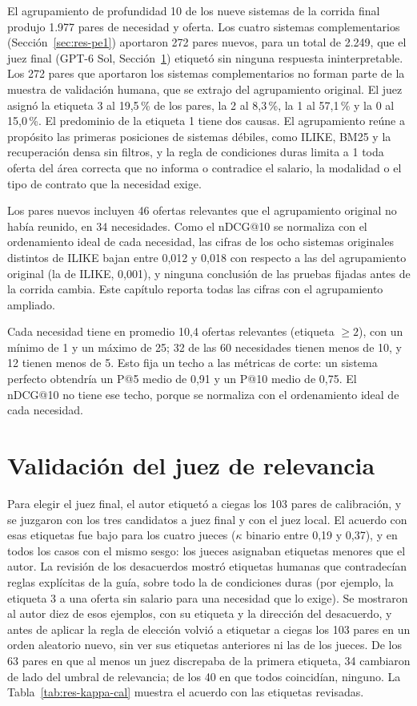 El agrupamiento de profundidad 10 de los nueve sistemas de la corrida final produjo 1.977 pares de necesidad y oferta. Los cuatro sistemas complementarios (Sección~\ref{sec:res-pe1}) aportaron 272 pares nuevos, para un total de 2.249, que el juez final (GPT-6 Sol, Sección~\ref{sec:res-juez}) etiquetó sin ninguna respuesta ininterpretable. Los 272 pares que aportaron los sistemas complementarios no forman parte de la muestra de validación humana, que se extrajo del agrupamiento original. El juez asignó la etiqueta 3 al 19,5\,\% de los pares, la 2 al 8,3\,\%, la 1 al 57,1\,\% y la 0 al 15,0\,\%. El predominio de la etiqueta 1 tiene dos causas. El agrupamiento reúne a propósito las primeras posiciones de sistemas débiles, como ILIKE, BM25 y la recuperación densa sin filtros, y la regla de condiciones duras limita a 1 toda oferta del área correcta que no informa o contradice el salario, la modalidad o el tipo de contrato que la necesidad exige.

Los pares nuevos incluyen 46 ofertas relevantes que el agrupamiento original no había reunido, en 34 necesidades. Como el nDCG@10 se normaliza con el ordenamiento ideal de cada necesidad, las cifras de los ocho sistemas originales distintos de ILIKE bajan entre 0,012 y 0,018 con respecto a las del agrupamiento original (la de ILIKE, 0,001), y ninguna conclusión de las pruebas fijadas antes de la corrida cambia. Este capítulo reporta todas las cifras con el agrupamiento ampliado.

Cada necesidad tiene en promedio 10,4 ofertas relevantes (etiqueta $\geq 2$), con un mínimo de 1 y un máximo de 25; 32 de las 60 necesidades tienen menos de 10, y 12 tienen menos de 5. Esto fija un techo a las métricas de corte: un sistema perfecto obtendría un P@5 medio de 0,91 y un P@10 medio de 0,75. El nDCG@10 no tiene ese techo, porque se normaliza con el ordenamiento ideal de cada necesidad.

\section{Validación del juez de relevancia}
\label{sec:res-juez}

Para elegir el juez final, el autor etiquetó a ciegas los 103 pares de calibración, y se juzgaron con los tres candidatos a juez final y con el juez local. El acuerdo con esas etiquetas fue bajo para los cuatro jueces ($\kappa$ binario entre 0,19 y 0,37), y en todos los casos con el mismo sesgo: los jueces asignaban etiquetas menores que el autor. La revisión de los desacuerdos mostró etiquetas humanas que contradecían reglas explícitas de la guía, sobre todo la de condiciones duras (por ejemplo, la etiqueta 3 a una oferta sin salario para una necesidad que lo exige). Se mostraron al autor diez de esos ejemplos, con su etiqueta y la dirección del desacuerdo, y antes de aplicar la regla de elección volvió a etiquetar a ciegas los 103 pares en un orden aleatorio nuevo, sin ver sus etiquetas anteriores ni las de los jueces. De los 63 pares en que al menos un juez discrepaba de la primera etiqueta, 34 cambiaron de lado del umbral de relevancia; de los 40 en que todos coincidían, ninguno. La Tabla~\ref{tab:res-kappa-cal} muestra el acuerdo con las etiquetas revisadas.


